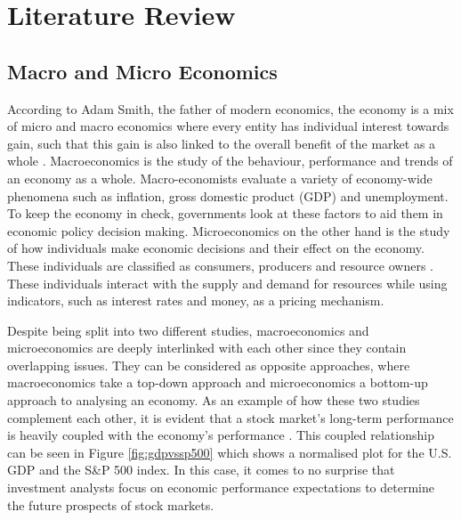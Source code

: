 \documentclass{UoYCSproject}
\begin{document}
\chapter{Literature Review}
\label{cha:literaturereview}

\section{Macro and Micro Economics}
\label{macroandmicro}
According to Adam Smith, the father of modern economics, the economy is a mix of micro and macro economics where every entity has individual interest towards gain, such that this gain is also linked to the overall benefit of the market as a whole \cite{smith1950inquiry}. Macroeconomics is the study of the behaviour, performance and trends of an economy as a whole. Macro-economists evaluate a variety of economy-wide phenomena such as inflation, gross domestic product (GDP) and unemployment. To keep the economy in check, governments look at these factors to aid them in economic policy decision making. Microeconomics on the other hand is the study of how individuals make economic decisions and their effect on the economy. These individuals are classified as consumers, producers and resource owners \cite{dwivedi2002microeconomics}. These individuals interact with the supply and demand for resources while using indicators, such as interest rates and money, as a pricing mechanism. 

Despite being split into two different studies, macroeconomics and microeconomics are deeply interlinked with each other since they contain overlapping issues. They can be considered as opposite approaches, where macroeconomics take a top-down approach and microeconomics a bottom-up approach to analysing an economy. As an example of how these two studies complement each other, it is evident that a stock market's long-term performance is heavily coupled with the economy's performance \cite{davis2008macroeconomic}. This coupled relationship can be seen in Figure \ref{fig:gdpvssp500} which shows a normalised plot for the U.S. GDP and the S\&P 500 index. In this case, it comes to no surprise that investment analysts focus on economic performance expectations to determine the future prospects of stock markets.
\end{document}
